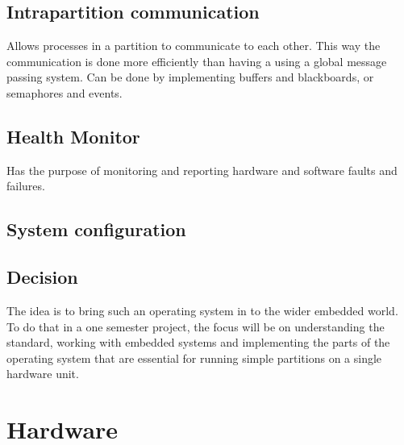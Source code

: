 \subsection{Intrapartition communication}
Allows processes in a partition to communicate to each other. This way
the communication is done more efficiently than having  a using a 
global message passing system.
Can be done by implementing buffers and blackboards, or semaphores and 
events.

\subsection{Health Monitor}
Has the purpose of monitoring and reporting hardware and software faults
and failures.

\subsection{System configuration}

\subsection{Decision}
The idea is to bring such an operating system in to the wider embedded world.
To do that in a one semester project, the focus will be on understanding the standard,
working with embedded systems and implementing the parts of the operating system that are
essential for running simple partitions on a single hardware unit.

\section{Hardware}

